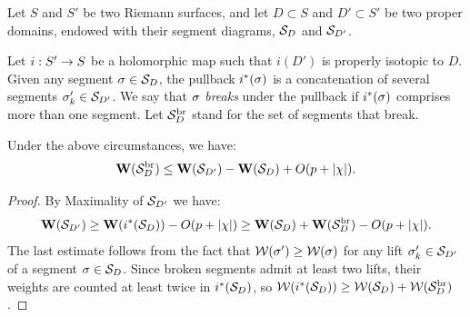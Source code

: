 { 

Let $S$ and $S'$ be two Riemann surfaces, and let $D\subset S$ and
$D'\subset S'$ be two proper domains, endowed with their
segment diagrams, ${\mathcal S}_D$ and ${\mathcal S}_{D'}$.

Let $i: S' \rightarrow S $ be a holomorphic map such that $i(D')$ is properly
  isotopic to $D$.  Given any  segment $\sigma \in {\mathcal S}_D$, the pullback
  $i^*({\sigma})$ is a   concatenation of several  segments ${\sigma}_k'\in {\mathcal S}_{D'}$.   
  We say
  that ${\sigma}$ {\it breaks} under the pullback if $i^*({\sigma})$ comprises more
  than one segment. Let ${\mathcal S}_D^{\mathrm{br}}$ stand for the set of segments that break.     
  

  


\begin{lem}\label{key estimate} 
  Under the above circumstances,  we have:
$$
     {\mathbf{W}} ({\mathcal S}_D^{\mathrm{br}}) \leq {\mathbf{W}} ({\mathcal S}_{D'}) - {\mathbf{W}} ({\mathcal S}_D)  + O(p+|\chi|). 
$$
\end{lem}

\begin{proof}
  By Maximality of ${\mathcal S}_{D'} $ we have:
$$
{\mathbf{W}}({\mathcal S}_{D'}) \geq {\mathbf{W}}  ( i^*({\mathcal S}_D) ) - O(p+|\chi|)
  \geq {\mathbf{W}} ({\mathcal S}_D)  + {\mathbf{W}}({\mathcal S}_D^{\mathrm{br}}) - O(p+|\chi|).
$$
The last estimate follows from the fact that    ${\mathcal W}({\sigma}') \geq {\mathcal W}({\sigma})$
for any lift $ {\sigma}_k'\in {\mathcal S}_{D'}  $ of  a segment ${\sigma}\in {\mathcal S}_D$. Since
broken segments  admit at least two lifts, their weights are counted
at least twice in $i^* ({\mathcal S}_D) $, so
$ {\mathcal W}(i^*({\mathcal S}_D)) \geq {\mathcal W}({\mathcal S}_D)+{\mathcal W}({\mathcal S}_D^{\mathrm{br}})$.  
\end{proof}


}
